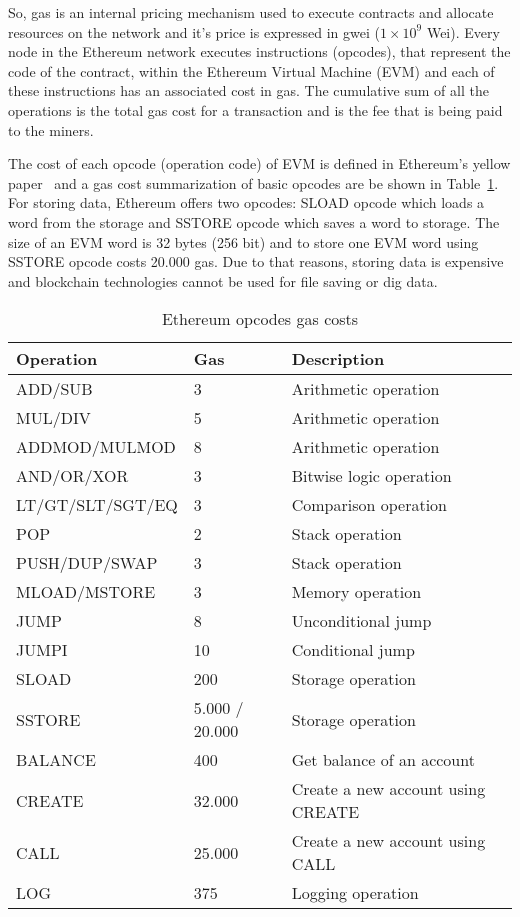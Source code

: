 So, gas is an internal pricing mechanism used to execute contracts and allocate resources on the network and it's price is expressed in gwei ($1 \times 10^9$ Wei). Every node in the Ethereum network executes instructions (opcodes), that represent the code of the contract, within the Ethereum Virtual Machine (EVM) and each of these instructions has an associated cost in gas. The cumulative sum of all the operations is the total gas cost for a transaction and is the fee that is being paid to the miners.

The cost of each opcode (operation code) of EVM is defined in Ethereum's yellow paper~\cite{ethereum_yellowpaper} and a gas cost summarization of basic opcodes are be shown in Table~\ref{table:opcode_gas_cost}. For storing data, Ethereum offers two opcodes: SLOAD opcode which loads a word from the storage and SSTORE opcode which saves a word to storage. The size of an EVM word is 32 bytes (256 bit) and to store one EVM word using SSTORE opcode costs 20.000 gas. Due to that reasons, storing data is expensive and blockchain technologies cannot be used for file saving or dig data.

\begin{table}[!ht]
  \centering
  \begin{tabular}{|l|l|l|}
  \hline
   Operation & Gas  & Description \\ \hline
   ADD/SUB & 3 & Arithmetic operation \\ \hline
   MUL/DIV & 5 & Arithmetic operation \\ \hline
   ADDMOD/MULMOD & 8 & Arithmetic operation \\ \hline
   AND/OR/XOR & 3 & Bitwise logic operation \\ \hline
   LT/GT/SLT/SGT/EQ & 3 & Comparison operation \\ \hline
   POP & 2 & Stack operation \\ \hline
   PUSH/DUP/SWAP & 3 & Stack operation \\ \hline
   MLOAD/MSTORE & 3 & Memory operation \\ \hline
   JUMP & 8 & Unconditional jump \\ \hline
   JUMPI & 10 & Conditional jump \\ \hline
   SLOAD & 200 & Storage operation \\ \hline
   SSTORE & 5.000 / 20.000 & Storage operation \\ \hline
   BALANCE & 400 & Get balance of an account \\ \hline
   CREATE & 32.000 & Create a new account using CREATE \\ \hline
   CALL & 25.000 & Create a new account using CALL \\ \hline
   LOG & 375 & Logging operation \\ \hline
  \end{tabular}
  \caption{Ethereum opcodes gas costs}
  \label{table:opcode_gas_cost}
\end{table}

